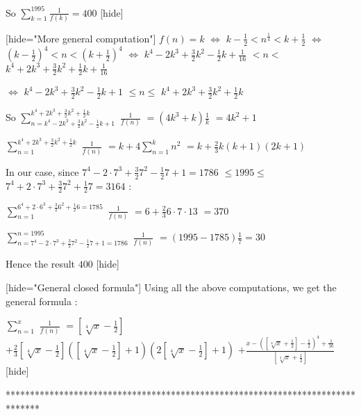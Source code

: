 \begin{solution}
So $ \sum_{k = 1}^{1995}\frac 1{f(k)} = 400$
[\/hide]

[hide="More general computation"]
$ f(n) = k$ $ \iff$ $ k - \frac 12 < n^{\frac 14} < k + \frac 12$ $ \iff$ ${ (k - \frac 12)^4 < n < (k + \frac 12)^4}$ 
$ \iff$ $ k^4 - 2k^3 + \frac 32k^2 - \frac 12k + \frac 1{16}$ $ < n <$ $ k^4 + 2k^3 + \frac 32k^2 + \frac 12k + \frac 1{16}$

$ \iff$ $ k^4 - 2k^3 + \frac 32k^2 - \frac 12k + 1$ $ \le n \le$ $ k^4 + 2k^3 + \frac 32k^2 + \frac 12k$

So $ \sum_{n = k^4 - 2k^3 + \frac 32k^2 - \frac 12k + 1}^{k^4 + 2k^3 + \frac 32k^2 + \frac 12k}$ $ \frac 1{f(n)}$ $ = (4k^3 + k)\frac 1k$ $ = 4k^2 + 1$

$ \sum_{n = 1}^{k^4 + 2k^3 + \frac 32k^2 + \frac 12k}$ $ \frac 1{f(n)}$ $ = k + 4\sum_{n = 1}^kn^2$ $ = k + \frac 23k(k + 1)(2k + 1)$

In our case, since $ 7^4 - 2\cdot 7^3 + \frac 327^2 - \frac 127 + 1 = 1786$ $ \le 1995 \le$ $ 7^4 + 2\cdot 7^3 + \frac 327^2 + \frac 127 = 3164$ :

$ \sum_{n = 1}^{6^4 + 2\cdot 6^3 + \frac 326^2 + \frac 126 = 1785}$ $ \frac 1{f(n)}$ $ = 6 + \frac 236\cdot 7\cdot 13$ $ = 370$

$ \sum_{n = 7^4 - 2\cdot 7^3 + \frac 327^2 - \frac 127 + 1 = 1786}^{n = 1995}$ $ \frac 1{f(n)}$ $ = (1995 - 1785)\frac 17 = 30$

Hence the result $ 400$
[\/hide]

[hide="General closed formula"]
Using all the above computations, we get the general formula :

$ \sum_{n=1}^x$ $ \frac 1{f(n)}$ $ =[\sqrt[4]x-\frac 12]$ $ +\frac 23[\sqrt[4]x-\frac 12]([\sqrt[4]x-\frac 12]+1)(2[\sqrt[4]x-\frac 12]+1)$ $ +\frac{x-([\sqrt[4]x+\frac 12]-\frac 12)^4+\frac 1{16}}{[\sqrt[4]x+\frac 12]}$
[\/hide]
\end{solution}
*******************************************************************************
